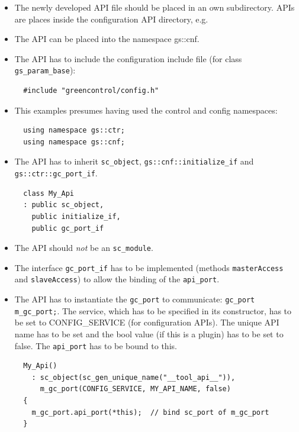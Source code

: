 \begin{itemize}
	\item The newly developed API file should be placed in an own subdirectory. \GreenConfig APIs are places inside the configuration API directory, e.g. 
	\item The API can be placed into the namespace {\sffamily gs::cnf}.
	\item The API has to include the configuration include file (for class \lstinline|gs_param_base|):
\begin{lstlisting}
  #include "greencontrol/config.h"
\end{lstlisting}

    \item This examples presumes having used the control and config namespaces:
\begin{lstlisting}
  using namespace gs::ctr;
  using namespace gs::cnf;
\end{lstlisting}

	\item The API has to inherit \lstinline|sc_object|, \lstinline|gs::cnf::initialize_if| and \mbox{\lstinline|gs::ctr::gc_port_if|.}
\begin{lstlisting}
  class My_Api
  : public sc_object,
    public initialize_if,
    public gc_port_if
\end{lstlisting}

	\item The API should {\em not} be an \lstinline|sc_module|.

	\item The interface \lstinline|gc_port_if| has to be implemented (methods \lstinline|masterAccess| and \lstinline|slaveAccess|) to allow the binding of the \lstinline|api_port|.

	\item The API has to instantiate the \lstinline|gc_port| to communicate: \mbox{\lstinline|gc_port m_gc_port;|.} The service, which has to be specified in its constructor, has to be set to {\sffamily CONFIG\_SERVICE} (for configuration APIs). The unique API name has to be set and the bool value (if this is a plugin) has to be set to {\sffamily false}. The \lstinline|api_port| has to be bound to {\sffamily this}.
\begin{lstlisting}
  My_Api()
    : sc_object(sc_gen_unique_name("__tool_api__")),
      m_gc_port(CONFIG_SERVICE, MY_API_NAME, false)
  {
    m_gc_port.api_port(*this);  // bind sc_port of m_gc_port
  }
\end{lstlisting}


\end{itemize}
